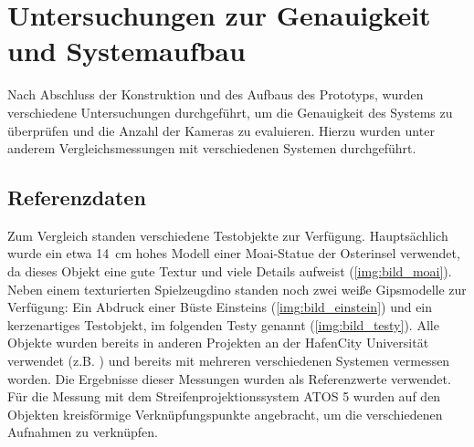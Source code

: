 \documentclass[./00PhotoBox.tex]{subfiles}
\begin{document}
\chapter{Untersuchungen zur Genauigkeit und Systemaufbau}
\label{c:versuche}
Nach Abschluss der Konstruktion und des Aufbaus des Prototyps, wurden verschiedene Untersuchungen durchgeführt, um die Genauigkeit des Systems zu überprüfen und die Anzahl der Kameras zu evaluieren. Hierzu wurden unter anderem Vergleichsmessungen mit verschiedenen Systemen durchgeführt.

\section{Referenzdaten}
\label{s:referenzdaten}
Zum Vergleich standen verschiedene Testobjekte zur Verfügung. Hauptsächlich wurde ein etwa \SI{14}{\centi\metre} hohes Modell einer Moai-Statue der Osterinsel verwendet, da dieses Objekt eine gute Textur und viele Details aufweist (\autoref{img:bild_moai}). Neben einem texturierten Spielzeugdino standen noch zwei weiße Gipsmodelle zur Verfügung: Ein Abdruck einer Büste Einsteins  (\autoref{img:bild_einstein}) und ein kerzenartiges Testobjekt, im folgenden Testy genannt (\autoref{img:bild_testy}). Alle Objekte wurden bereits in anderen Projekten an der HafenCity Universität verwendet (z.B. \citet{kersten_scanner}) und bereits mit mehreren verschiedenen Systemen vermessen worden. Die Ergebnisse dieser Messungen wurden als Referenzwerte verwendet. Für die Messung mit dem Streifenprojektionssystem ATOS 5 wurden auf den Objekten kreisförmige Verknüpfungspunkte angebracht, um die verschiedenen Aufnahmen zu verknüpfen.
\end{document}
